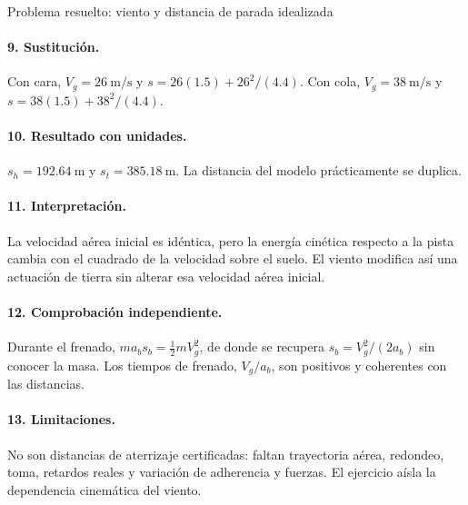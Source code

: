 \begin{studiumworked}{Problema resuelto: viento y distancia de parada idealizada}
\paragraph{9. Sustitución.} Con cara, $V_g=26\ \mathrm{m/s}$ y $s=26(1.5)+26^2/(4.4)$. Con cola, $V_g=38\ \mathrm{m/s}$ y $s=38(1.5)+38^2/(4.4)$.
\paragraph{10. Resultado con unidades.} $s_h=192.64\ \mathrm m$ y $s_t=385.18\ \mathrm m$. La distancia del modelo prácticamente se duplica.
\paragraph{11. Interpretación.} La velocidad aérea inicial es idéntica, pero la energía cinética respecto a la pista cambia con el cuadrado de la velocidad sobre el suelo. El viento modifica así una actuación de tierra sin alterar esa velocidad aérea inicial.
\paragraph{12. Comprobación independiente.} Durante el frenado, $ma_bs_b=\tfrac12mV_g^2$, de donde se recupera $s_b=V_g^2/(2a_b)$ sin conocer la masa. Los tiempos de frenado, $V_g/a_b$, son positivos y coherentes con las distancias.
\paragraph{13. Limitaciones.} No son distancias de aterrizaje certificadas: faltan trayectoria aérea, redondeo, toma, retardos reales y variación de adherencia y fuerzas. El ejercicio aísla la dependencia cinemática del viento.


\end{studiumworked}

